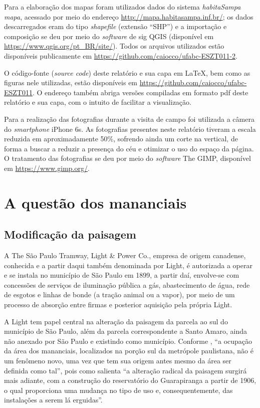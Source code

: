 	Para a elaboração dos mapas foram utilizados dados do sistema \textit{habitaSampa mapa}, acessado por meio do endereço \url{http://mapa.habitasampa.inf.br/}; os dados descarregados eram do tipo \textit{shapefile} (extensão ``SHP'') e a importação e composição se deu por meio do \textit{software} de \gls{sig} QGIS (disponível em \url{https://www.qgis.org/pt_BR/site/}). Todos os arquivos utilizados estão disponíveis publicamente em \url{https://github.com/caiocco/ufabc-ESZT011-2}.

	O código-fonte (\textit{source code}) deste relatório e sua capa em \LaTeX, bem como as figuras nele utilizadas, estão disponíveis em \url{https://github.com/caiocco/ufabc-ESZT011}. O endereço também abriga versões compiladas em formato \gls{pdf} deste relatório e sua capa, com o intuito de facilitar a visualização.
	
	Para a realização das fotografias durante a visita de campo foi utilizada a câmera do \textit{smartphone} iPhone 6s. As fotografias presentes neste relatório tiveram a escala reduzida em aproximadamente 50\%, sofrendo ainda um corte na vertical, de forma a buscar a reduzir a presença do céu e otimizar o uso do espaço da página. O tratamento das fotografias se deu por meio do \textit{software} The GIMP, disponível em \url{https://www.gimp.org/}.
	
	\chapter{A questão dos mananciais}
	
	\section{Modificação da paisagem} \label{light}
	
	A The São Paulo Tramway, Light \& Power Co., empresa de origem canadense, conhecida e a partir daqui também denominada por Light, é autorizada a operar e se instala no município de São Paulo em 1899, a partir daí, envolve-se com concessões de serviços de iluminação pública a gás, abastecimento de água, rede de esgotos e linhas de bonde (a tração animal ou a vapor), por meio de um processo de absorção entre firmas e posterior aquisição pela própria Light.
	
	A Light tem papel central na alteração da paisagem da parcela ao sul do município de São Paulo, além da parcela correspondente a Santo Amaro, ainda não anexado por São Paulo e existindo como município. Conforme , ``a ocupação da área dos mananciais, localizados na porção sul da metrópole paulistana, não é um fenômeno novo, uma vez que tem sua origem antes mesmo da área ser definida como tal'', pois como salienta  ``a alteração radical da paisagem surgirá mais adiante, com a construção do reservatório do Guarapiranga a partir de 1906, o qual proporciona uma mudança no tipo de uso e, consequentemente, das instalações a serem lá erguidas''.
	
